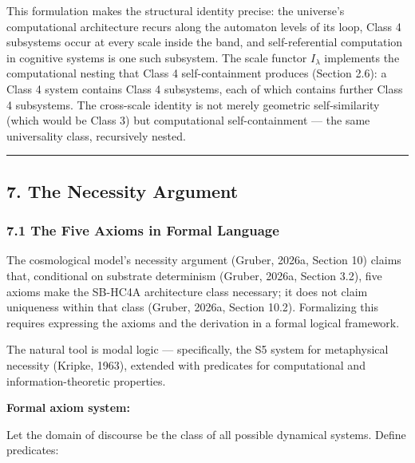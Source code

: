 \documentclass[
]{article}
\begin{document}
This formulation makes the structural identity precise: the universe's
computational architecture recurs along the automaton levels of its
loop, Class 4 subsystems occur at every scale inside the band, and
self-referential computation in cognitive systems is one such subsystem.
The scale functor \(I_{\lambda}\) implements the computational nesting
that Class 4 self-containment produces (Section 2.6): a Class 4 system
contains Class 4 subsystems, each of which contains further Class 4
subsystems. The cross-scale identity is not merely geometric
self-similarity (which would be Class 3) but computational
self-containment --- the same universality class, recursively nested.

\begin{center}\rule{0.5\linewidth}{0.5pt}\end{center}

\hypertarget{the-necessity-argument}{%
\subsection{7. The Necessity Argument}\label{the-necessity-argument}}

\hypertarget{the-five-axioms-in-formal-language}{%
\subsubsection{7.1 The Five Axioms in Formal
Language}\label{the-five-axioms-in-formal-language}}

The cosmological model's necessity argument (Gruber, 2026a, Section 10)
claims that, conditional on substrate determinism (Gruber, 2026a,
Section 3.2), five axioms make the SB-HC4A architecture class necessary;
it does not claim uniqueness within that class (Gruber, 2026a, Section
10.2). Formalizing this requires expressing the axioms and the
derivation in a formal logical framework.

The natural tool is modal logic --- specifically, the S5 system for
metaphysical necessity (Kripke, 1963), extended with predicates for
computational and information-theoretic properties.

\textbf{Formal axiom system:}

Let the domain of discourse be the class of all possible dynamical
systems. Define predicates:
\end{document}
